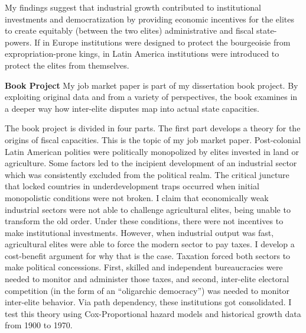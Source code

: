 \documentclass[11pt]{letter} %
\begin{document}
\begin{letter}{}
My findings suggest that industrial growth contributed to institutional investments and democratization by providing economic incentives for the elites to create equitably (between the two elites) administrative and fiscal state-powers. If in Europe institutions were designed to protect the bourgeoisie from expropriation-prone kings, in Latin America institutions were introduced to protect the elites from themselves.

{\bf Book Project} My job market paper is part of my dissertation book project. By exploiting original data and from a variety of perspectives, the book examines in a deeper way how inter-elite disputes map into actual state capacities.

The book project is divided in four parts. The first part develops a theory for the origins of fiscal capacities. This is the topic of my job market paper. Post-colonial Latin American polities were politically monopolized by elites invested in land or agriculture. Some factors led to the incipient development of an industrial sector which was consistently excluded from the political realm. The critical juncture that locked countries in underdevelopment traps occurred when initial monopolistic conditions were not broken. I claim that economically weak industrial sectors were not able to challenge agricultural elites, being unable to transform the old order. Under these conditions, there were not incentives to make institutional investments. However, when industrial output was fast, agricultural elites were able to force the modern sector to pay taxes. I develop a cost-benefit argument for why that is the case. Taxation forced both sectors to make political concessions. First, skilled and independent bureaucracies were needed to monitor and administer those taxes, and second, inter-elite electoral competition (in the form of an ``oligarchic democracy'') was needed to monitor inter-elite behavior. Via path dependency, these institutions got consolidated. I test this theory using Cox-Proportional hazard models and historical growth data from 1900 to 1970. 


\end{letter}
\end{document}
